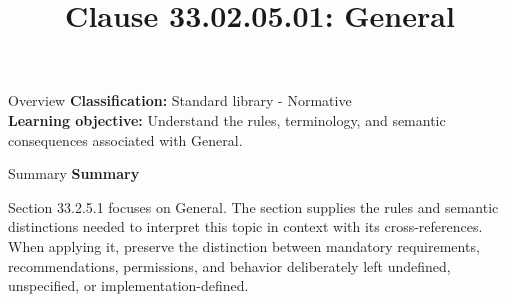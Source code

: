 \documentclass[10pt,letterpaper]{article}
\title{Clause 33.02.05.01: General}
\author{}
\date{}
\begin{document}
\maketitle
\begin{CornellOverviewBox}{Overview}
\textbf{Classification:} Standard library - Normative\\[2pt]
\textbf{Learning objective:} Understand the rules, terminology, and semantic consequences associated with General.
\end{CornellOverviewBox}\begin{CornellSummaryBox}{Summary}
{\sffamily\bfseries\color{Accent} Summary}\par\vspace{3pt}Section 33.2.5.1 focuses on General. The section supplies the rules and semantic distinctions needed to interpret this topic in context with its cross-references. When applying it, preserve the distinction between mandatory requirements, recommendations, permissions, and behavior deliberately left undefined, unspecified, or implementation-defined.
\end{CornellSummaryBox}
\end{document}
